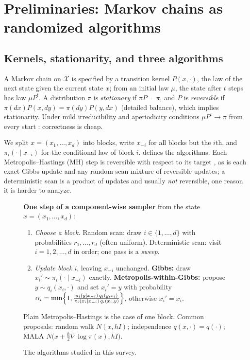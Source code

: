 \documentclass[11pt]{article}
\theoremstyle{remark}
\newcommand{\X}{\mathcal{X}}
\begin{document}
\section{Preliminaries: Markov chains as randomized algorithms}\label{sec:prelim}

\subsection{Kernels, stationarity, and three algorithms}
A Markov chain on $\X$ is specified by a transition kernel $P(x,\cdot)$, the law of the next state given the current state $x$; from an initial law $\mu$, the state after $t$ steps has law $\mu P^t$. A distribution $\pi$ is \emph{stationary} if $\pi P=\pi$, and $P$ is \emph{reversible} if $\pi(dx)P(x,dy)=\pi(dy)P(y,dx)$ (detailed balance), which implies stationarity. Under mild irreducibility and aperiodicity conditions $\mu P^t\to\pi$ from every start \citep{tierney1994,roberts2004general}: correctness is cheap.

We split $x=(x_1,\dots,x_d)$ into blocks, write $x_{-i}$ for all blocks but the $i$th, and $\pi_i(\cdot\mid x_{-i})$ for the conditional law of block $i$.  defines the algorithms. Each Metropolis--Hastings (MH) step is reversible with respect to its target \citep{metropolis1953,hastings1970}, as is each exact Gibbs update and any random-scan mixture of reversible updates; a deterministic scan is a product of updates and usually \emph{not} reversible, one reason it is harder to analyze.

\begin{figure}[t]
\begin{tcolorbox}[colback=gray!3,colframe=gray!45,boxrule=0.4pt,left=5pt,right=5pt,top=3pt,bottom=3pt,arc=2pt]
\small
\textbf{One step of a component-wise sampler} from the state $x=(x_1,\dots,x_d)$:
\begin{enumerate}[leftmargin=1.4em,nosep]
\item \emph{Choose a block.} Random scan: draw $i\in\{1,\dots,d\}$ with probabilities $r_1,\dots,r_d$ (often uniform). Deterministic scan: visit $i=1,2,\dots,d$ in order; one pass is a \emph{sweep}.
\item \emph{Update block $i$}, leaving $x_{-i}$ unchanged.
\textbf{Gibbs:} draw $x_i'\sim\pi_i(\cdot\mid x_{-i})$ exactly.
\textbf{Metropolis-within-Gibbs:} propose $y\sim q_i(x_i,\cdot)$ and set $x_i'=y$ with probability
$\alpha_i=\min\Bigl\{1,\frac{\pi_i(y\mid x_{-i})\,q_i(y,x_i)}{\pi_i(x_i\mid x_{-i})\,q_i(x_i,y)}\Bigr\}$, otherwise $x_i'=x_i$.
\end{enumerate}
Plain Metropolis--Hastings is the case of one block. Common proposals: random walk $N(x,hI)$; independence $q(x,\cdot)=q(\cdot)$; MALA $N\bigl(x+\tfrac h2\nabla\log\pi(x),hI\bigr)$.
\end{tcolorbox}
\vspace{-6pt}
\caption{The algorithms studied in this survey.}
\label{fig:alg}
\end{figure}
\end{document}

